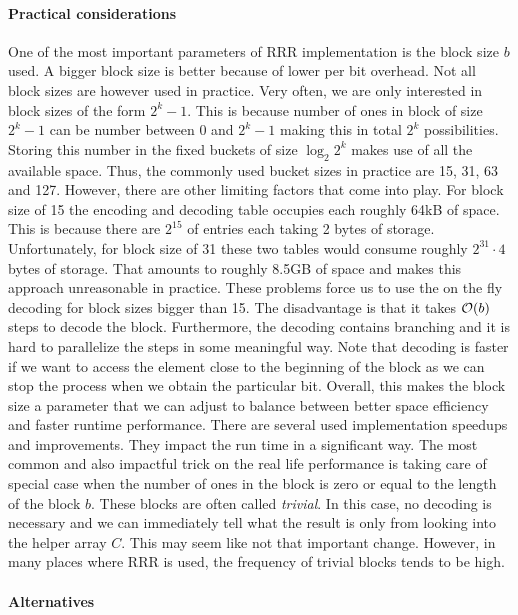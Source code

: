 \paragraph{Practical considerations}
\label{subsection:block_size}

One of the most important parameters of RRR implementation is the block
size $b$ used. A bigger block size is better because of lower per bit overhead. Not
all block sizes are however used in practice. Very often, we are only interested in
block sizes of the form $2^k-1$. This is because number of ones in block of size $2^k-1$
can be number between 0 and $2^k-1$ making this in total $2^k$ possibilities. Storing
this number in the fixed buckets of size $\log_2 2^k$ makes use of all the available space.
Thus, the commonly used bucket sizes in practice are 15, 31, 63 and 127. However, there are
other limiting factors that come into play. For block size of 15 the encoding and decoding table
occupies each roughly 64kB of space. This is because there are $2^{15}$ of entries each taking
2 bytes of storage. Unfortunately, for block size of 31 these two tables would consume roughly
$2^{31}\cdot 4$ bytes of storage. That amounts to roughly 8.5GB of space and makes this approach
unreasonable in practice. These problems force us to use the on the fly decoding for block sizes
bigger than 15. The disadvantage is that it takes $\mathcal{O}(b)$ steps to decode the block. Furthermore,
the decoding contains branching and it is hard to parallelize the steps in some meaningful way.
Note that decoding is faster if we want to access the element close to the beginning of
the block as we can stop the process when we obtain the particular bit. Overall, this makes the block
size a parameter that we can adjust to balance between better space efficiency and faster
runtime performance. There are several used implementation speedups and improvements. They impact
the run time in a significant way. The most common and also impactful trick on the real life
performance is taking care of special case when the number of ones in the block
is zero or equal to the length of the block $b$. These blocks are often called \textit{trivial}. 
In this case, no decoding is necessary and we can immediately tell what the result is only from
looking into the helper array $C$. This may seem like not that important change. However, in many
places where RRR is used, the frequency of trivial blocks tends to be high.

\paragraph{Alternatives}

